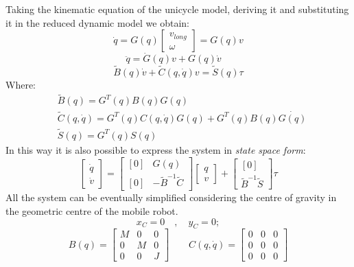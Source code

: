 Taking the kinematic equation of the unicycle model, deriving it and substituting it in the reduced dynamic model we obtain:
\begin{equation}\label{base_kin_mod}
\dot{q}=G(q)\left[
\begin{matrix}
v_{long} \\ \omega
\end{matrix}
\right] =G(q)v
\end{equation}
\begin{equation}
\ddot{q}=\dot{G}(q)v+G(q)\dot{v}
\quad
\end{equation}
\begin{equation}
\tilde{B}(q)\dot{v}+\tilde{C}(q,\dot{q})v = \tilde{S}(q)\tau
\end{equation}
Where:
\begin{align*}
&\tilde{B}(q) = G^T(q)B(q)G(q) \\
&\tilde{C}(q,\dot{q}) = G^T(q)C(q,\dot{q})G(q) + G^T(q)B(q)\dot{G(q)} \\
&\tilde{S}(q) = G^T(q)S(q) 
\end{align*}
In this way it is also possible to express the system in \textit{state space form}:
\begin{equation}
\left[ 
\begin{matrix}
\dot{q} \\ \dot{v}
\end{matrix}
\right] = \left[ 
\begin{matrix}
[0] & G(q)\\ [0] & -\tilde{B}^{-1}\tilde{C}
\end{matrix}
\right]\left[ 
\begin{matrix}
q \\ v
\end{matrix}
\right] + \left[ 
\begin{matrix}
[0] \\ \tilde{B}^{-1}\tilde{S}
\end{matrix}
\right] \tau
\end{equation}
All the system can be eventually simplified considering the centre of gravity in the geometric centre of the mobile robot. 
\begin{equation*}
x_C=0\quad,\quad y_C=0;
\end{equation*}
\begin{equation}
B(q) = \left[\begin{matrix}
M & 0 & 0\\ 0 & M & 0 \\ 0 & 0 & J
\end{matrix} \right]
\qquad 
C(q,\dot{q}) = \left[\begin{matrix}
0 & 0 & 0\\ 0 & 0 & 0 \\ 0 & 0 & 0
\end{matrix} \right]
\end{equation}
